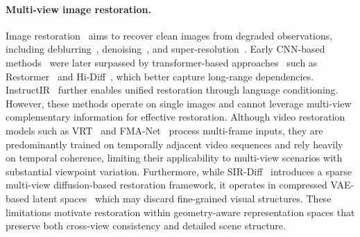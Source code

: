 \documentclass{llmxive}
\begin{document}
\paragraph{Multi-view image restoration.}
Image restoration~\cite{Jiang_2025, chen2026lovif2026challengerealworld, zamir2022restormer, Youk_2024_CVPR, zuo2018convolutional, nah2018deepmultiscaleconvolutionalneural} aims to recover clean images from degraded observations, including deblurring~\cite{liang2024vrt, zamir2022restormer, chen2023hierarchical}, denoising~\cite{zamir2022restormer, zhang2018ffdnet, zamfir2024complexityexperts}, and super-resolution~\cite{lin2024diffbir, duan2025dit4sr, min2025text, kim2025unifieddiffusiontransformerhighfidelity}. Early CNN-based methods~\cite{zuo2018convolutional, zhang2018ffdnet} were later surpassed by transformer-based approaches~\cite{zamir2022restormer, chen2023hierarchical} such as Restormer~\cite{zamir2022restormer} and Hi-Diff~\cite{chen2023hierarchical}, which better capture long-range dependencies. InstructIR~\cite{conde2024high} further enables unified restoration through language conditioning. However, these methods operate on single images and cannot leverage multi-view complementary information for effective restoration. Although video restoration models such as VRT~\cite{liang2024vrt} and FMA-Net~\cite{Youk_2024_CVPR} process multi-frame inputs, they are predominantly trained on temporally adjacent video sequences and rely heavily on temporal coherence, limiting their applicability to multi-view scenarios with substantial viewpoint variation. Furthermore, while SIR-Diff~\cite{mao2025sir} introduces a sparse multi-view diffusion-based restoration framework, it operates in compressed VAE-based latent spaces~\cite{kingma2013auto} which may discard fine-grained visual structures. These limitations motivate restoration within geometry-aware representation spaces that preserve both cross-view consistency and detailed scene structure.







\end{document}
